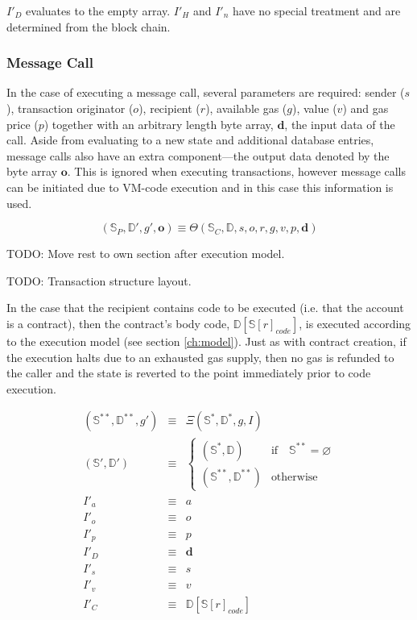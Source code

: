 \documentclass[9pt,oneside]{amsart}
\begin{document}
\begin{multicols}{2}
$I'_D$ evaluates to the empty array. $I'_H$ and $I'_n$ have no special treatment and are determined from the block chain.

\subsubsection{Message Call} \label{ch:call}

In the case of executing a message call, several parameters are required: sender ($s$), transaction originator ($o$), recipient ($r$), available gas ($g$), value ($v$) and gas price ($p$) together with an arbitrary length byte array, $\mathbf{d}$, the input data of the call. Aside from evaluating to a new state and additional database entries, message calls also have an extra component---the output data denoted by the byte array $\mathbf{o}$. This is ignored when executing transactions, however message calls can be initiated due to VM-code execution and in this case this information is used.

\begin{equation}
(\mathbb{S}_P, \mathbb{D}', g', \mathbf{o}) \equiv \Theta(\mathbb{S}_C, \mathbb{D}, s, o, r, g, v, p, \mathbf{d})
\end{equation}

TODO: Move rest to own section after execution model.

TODO: Transaction structure layout.


In the case that the recipient contains code to be executed (i.e. that the account is a contract), then the contract's body code, $\mathbb{D}[\mathbb{S}[r]_{code}]$, is executed according to the execution model (see section \ref{ch:model}). Just as with contract creation, if the execution halts due to an exhausted gas supply, then no gas is refunded to the caller and the state is reverted to the point immediately prior to code execution.

\begin{eqnarray}
(\mathbb{S}^{**}, \mathbb{D}^{**}, g') & \equiv & \Xi(\mathbb{S}^*, \mathbb{D}^*, g, I) \\
(\mathbb{S}', \mathbb{D}') & \equiv & \begin{cases}
(\mathbb{S}^*, \mathbb{D}) & \text{if} \quad \mathbb{S}^{**} = \varnothing \\
(\mathbb{S}^{**}, \mathbb{D}^{**}) & \text{otherwise}
\end{cases} \\
I'_a & \equiv & a \\
I'_o & \equiv & o \\
I'_p & \equiv & p \\
I'_D & \equiv & \mathbf{d} \\
I'_s & \equiv & s \\
I'_v & \equiv & v \\
I'_C & \equiv & \mathbb{D}[\mathbb{S}[r]_{code}]
\end{eqnarray}


\end{multicols}
\end{document}
